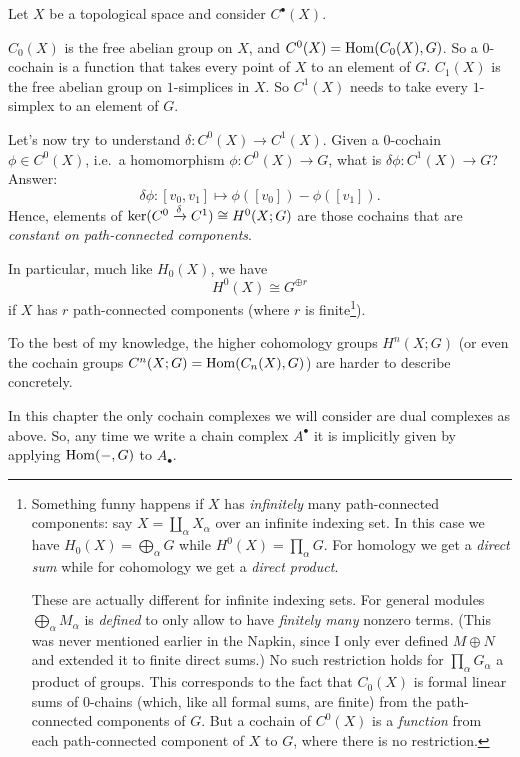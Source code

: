 \begin{example}
	[$C^0(X; G)$, $C^1(X; G)$, and $H^0(X;G)$]
	Let $X$ be a topological space and consider $C^\bullet(X)$.
	\begin{itemize}
		\ii $C_0(X)$ is the free abelian group on $X$,
		and $C^0(X) = \operatorname{Hom}(C_0(X), G)$.
		So a $0$-cochain is a function that
		takes every point of $X$ to an element of $G$.
		\ii $C_1(X)$ is the free abelian group on $1$-simplices in $X$.
		So $C^1(X)$ needs to take every $1$-simplex to an element of $G$.
	\end{itemize}
	Let's now try to understand $\delta \colon C^0(X) \to C^1(X)$.
	Given a $0$-cochain $\phi \in C^0(X)$,
	i.e.\ a homomorphism $\phi \colon C^0(X) \to G$,
	what is $\delta\phi \colon C^1(X) \to G$?
	Answer:
	\[ \delta\phi : [v_0, v_1] \mapsto \phi([v_0]) - \phi([v_1]). \]
	Hence, elements of
	$\ker(C^0 \xrightarrow{\delta} C^1) \cong H^0(X;G)$
	are those cochains
	that are \emph{constant on path-connected components}.
\end{example}
In particular, much like $H_0(X)$, we have \[ H^0(X) \cong G^{\oplus r} \]
if $X$ has $r$ path-connected components (where $r$ is finite\footnote{%
	Something funny happens if $X$ has \emph{infinitely} many path-connected components:
	say $X = \coprod_\alpha X_\alpha$ over an infinite indexing set.
	In this case we have
	$H_0(X) = \bigoplus_\alpha G$ while $H^0(X) = \prod_\alpha G$.
	For homology we get a \emph{direct sum} while
	for cohomology we get a \emph{direct product}.

	These are actually different for infinite indexing sets.
	For general modules $\bigoplus_\alpha M_\alpha$ is \emph{defined} to only allow
	to have \emph{finitely many} nonzero terms.
	(This was never mentioned earlier in the Napkin,
	since I only ever defined $M \oplus N$ and extended it to finite direct sums.)
	No such restriction holds for $\prod_\alpha G_\alpha$ a product of groups.
	This corresponds to the fact that $C_0(X)$ is formal linear sums of $0$-chains
	(which, like all formal sums, are finite)
	from the path-connected components of $G$.
	But a cochain of $C^0(X)$ is a \emph{function}
	from each path-connected component of $X$ to $G$,
	where there is no restriction.
}).

To the best of my knowledge, the higher cohomology groups $H^n(X; G)$
(or even the cochain groups $C^n(X; G) = \operatorname{Hom}(C_n(X), G)$) are harder to describe concretely.

\begin{abuse}
	In this chapter the only cochain complexes
	we will consider are dual complexes as above.
	So, any time we write a chain complex $A^\bullet$ it is implicitly given
	by applying $\operatorname{Hom}(-,G)$ to $A_\bullet$.
\end{abuse}

